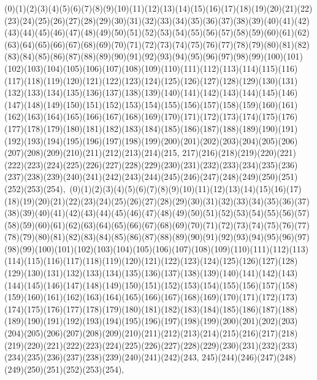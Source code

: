 \documentclass[12pt]{article}
\begin{document}
{(0)(1)(2)(3)(4)(5)(6)(7)(8)(9)(10)(11)(12)(13)(14)(15)(16)(17)(18)(19)(20)(21)(22)(23)(24)(25)(26)(27)(28)(29)(30)(31)(32)(33)(34)(35)(36)(37)(38)(39)(40)(41)(42)(43)(44)(45)(46)(47)(48)(49)(50)(51)(52)(53)(54)(55)(56)(57)(58)(59)(60)(61)(62)(63)(64)(65)(66)(67)(68)(69)(70)(71)(72)(73)(74)(75)(76)(77)(78)(79)(80)(81)(82)(83)(84)(85)(86)(87)(88)(89)(90)(91)(92)(93)(94)(95)(96)(97)(98)(99)(100)(101)(102)(103)(104)(105)(106)(107)(108)(109)(110)(111)(112)(113)(114)(115)(116)(117)(118)(119)(120)(121)(122)(123)(124)(125)(126)(127)(128)(129)(130)(131)(132)(133)(134)(135)(136)(137)(138)(139)(140)(141)(142)(143)(144)(145)(146)(147)(148)(149)(150)(151)(152)(153)(154)(155)(156)(157)(158)(159)(160)(161)(162)(163)(164)(165)(166)(167)(168)(169)(170)(171)(172)(173)(174)(175)(176)(177)(178)(179)(180)(181)(182)(183)(184)(185)(186)(187)(188)(189)(190)(191)(192)(193)(194)(195)(196)(197)(198)(199)(200)(201)(202)(203)(204)(205)(206)(207)(208)(209)(210)(211)(212)(213)(214)(215, 217)(216)(218)(219)(220)(221)(222)(223)(224)(225)(226)(227)(228)(229)(230)(231)(232)(233)(234)(235)(236)(237)(238)(239)(240)(241)(242)(243)(244)(245)(246)(247)(248)(249)(250)(251)(252)(253)(254)$
, 
$
(0)(1)(2)(3)(4)(5)(6)(7)(8)(9)(10)(11)(12)(13)(14)(15)(16)(17)(18)(19)(20)(21)(22)(23)(24)(25)(26)(27)(28)(29)(30)(31)(32)(33)(34)(35)(36)(37)(38)(39)(40)(41)(42)(43)(44)(45)(46)(47)(48)(49)(50)(51)(52)(53)(54)(55)(56)(57)(58)(59)(60)(61)(62)(63)(64)(65)(66)(67)(68)(69)(70)(71)(72)(73)(74)(75)(76)(77)(78)(79)(80)(81)(82)(83)(84)(85)(86)(87)(88)(89)(90)(91)(92)(93)(94)(95)(96)(97)(98)(99)(100)(101)(102)(103)(104)(105)(106)(107)(108)(109)(110)(111)(112)(113)(114)(115)(116)(117)(118)(119)(120)(121)(122)(123)(124)(125)(126)(127)(128)(129)(130)(131)(132)(133)(134)(135)(136)(137)(138)(139)(140)(141)(142)(143)(144)(145)(146)(147)(148)(149)(150)(151)(152)(153)(154)(155)(156)(157)(158)(159)(160)(161)(162)(163)(164)(165)(166)(167)(168)(169)(170)(171)(172)(173)(174)(175)(176)(177)(178)(179)(180)(181)(182)(183)(184)(185)(186)(187)(188)(189)(190)(191)(192)(193)(194)(195)(196)(197)(198)(199)(200)(201)(202)(203)(204)(205)(206)(207)(208)(209)(210)(211)(212)(213)(214)(215)(216)(217)(218)(219)(220)(221)(222)(223)(224)(225)(226)(227)(228)(229)(230)(231)(232)(233)(234)(235)(236)(237)(238)(239)(240)(241)(242)(243, 245)(244)(246)(247)(248)(249)(250)(251)(252)(253)(254)$
, 
$
}
\end{document}
